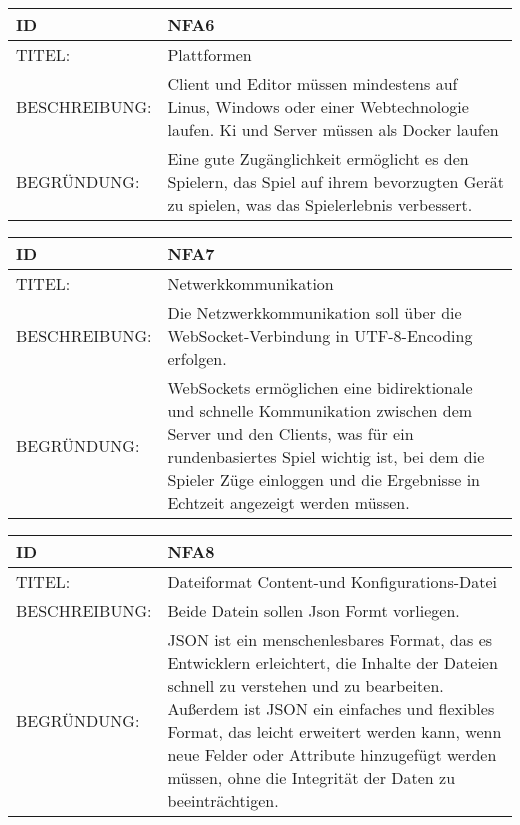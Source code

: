 \documentclass{uulm-assignment}
\begin{document}
    \begin{tabularx}{\textwidth}{|l|X |} \hline
        \textbf{ID} & \textbf{NFA6} \\
        \hline
        TITEL: &  Plattformen\\
        \hline
        BESCHREIBUNG: &  Client und Editor müssen mindestens auf Linus, Windows oder einer Webtechnologie laufen.
        Ki und Server müssen als Docker laufen\\
        \hline
        BEGRÜNDUNG: &  Eine gute Zugänglichkeit ermöglicht es den Spielern, das Spiel auf ihrem bevorzugten Gerät zu spielen, was das Spielerlebnis verbessert.\\
        \hline
    \end{tabularx}

    \begin{tabularx}{\textwidth}{|l|X |} \hline
        \textbf{ID} & \textbf{NFA7} \\
        \hline
        TITEL: &  Netwerkkommunikation\\
        \hline
        BESCHREIBUNG: &  Die Netzwerkkommunikation  soll über die WebSocket-Verbindung in UTF-8-Encoding erfolgen.\\
        \hline
        BEGRÜNDUNG: &  WebSockets ermöglichen eine bidirektionale und schnelle Kommunikation zwischen dem Server und den Clients, was für ein rundenbasiertes Spiel wichtig ist, bei dem die Spieler Züge einloggen und die Ergebnisse in Echtzeit angezeigt werden müssen.\\
        \hline
    \end{tabularx}

    \begin{tabularx}{\textwidth}{|l|X |} \hline
        \textbf{ID} & \textbf{NFA8} \\
        \hline
        TITEL: &  Dateiformat Content-und Konfigurations-Datei\\
        \hline
        BESCHREIBUNG: &  Beide Datein sollen Json Formt vorliegen.\\
        \hline
        BEGRÜNDUNG: &  JSON ist ein menschenlesbares Format, das es Entwicklern erleichtert, die Inhalte der Dateien schnell zu verstehen und zu bearbeiten. Außerdem ist JSON ein einfaches und flexibles Format, das leicht erweitert werden kann, wenn neue Felder oder Attribute hinzugefügt werden müssen, ohne die Integrität der Daten zu beeinträchtigen. \\
        \hline
    \end{tabularx}
\end{document}
